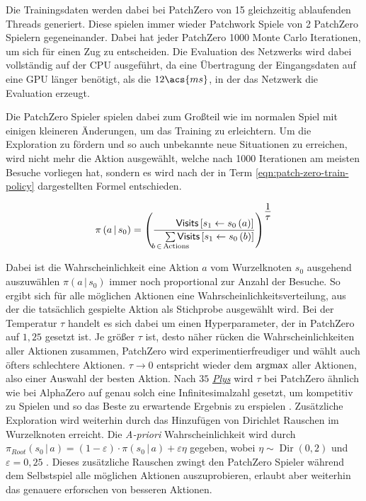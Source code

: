 Die Trainingsdaten werden dabei bei PatchZero von 15 gleichzeitig ablaufenden Threads generiert. Diese spielen immer wieder Patchwork Spiele von 2 PatchZero Spielern gegeneinander. Dabei hat jeder PatchZero 1000 Monte Carlo Iterationen, um sich für einen Zug zu entscheiden. Die Evaluation des Netzwerks wird dabei vollständig auf der \ac{CPU} ausgeführt, da eine Übertragung der Eingangsdaten auf eine \ac{GPU} länger benötigt, als die $12\acs{ms}$, in der das Netzwerk die Evaluation erzeugt.

Die PatchZero Spieler spielen dabei zum Großteil wie im normalen Spiel mit einigen kleineren Änderungen, um das Training zu erleichtern. Um die Exploration zu fördern und so auch unbekannte neue Situationen zu erreichen, wird nicht mehr die Aktion ausgewählt, welche nach 1000 Iterationen am meisten Besuche vorliegen hat, sondern es wird nach der in Term \ref{eqn:patch-zero-train-policy} dargestellten Formel entschieden.

\begin{align}
    \label{eqn:patch-zero-train-policy}
    \pi\left(a\,|\,s_0\right) = \left(\frac{\phantom{ab\sum} \mathsf{Visits}\left[s_1 \gets s_0\left(a\right) \right]}{\phantom{ab}\sum\limits_{\mathclap{b\, \in\, \text{Actions}}} \mathsf{Visits}\left[s_1 \gets s_0\left(b\right) \right]}\right)^{\text{\Large $\frac{1}{\tau}$}}
\end{align}

Dabei ist die Wahrscheinlichkeit eine Aktion $a$ vom Wurzelknoten $s_0$ ausgehend auszuwählen $\pi\left(a\,|\,s_0\right)$ immer noch proportional zur Anzahl der Besuche. So ergibt sich für alle möglichen Aktionen eine Wahrscheinlichkeitsverteilung, aus der die tatsächlich gespielte Aktion als Stichprobe ausgewählt wird. Bei der Temperatur $\tau$ handelt es sich dabei um einen Hyperparameter, der in PatchZero auf $1{,}25$ gesetzt ist. Je größer $\tau$ ist, desto näher rücken die Wahrscheinlichkeiten aller Aktionen zusammen, \dash PatchZero wird experimentierfreudiger und wählt auch öfters schlechtere Aktionen. $\tau \to 0$ entspricht wieder dem $\operatorname*{argmax}$ aller Aktionen, also einer Auswahl der besten Aktion. Nach $35$ \hyperref[text:ply]{\emph{Plys}} wird $\tau$ bei PatchZero ähnlich wie bei AlphaZero auf genau solch eine Infinitesimalzahl gesetzt, um kompetitiv zu Spielen und so das Beste zu erwartende Ergebnis zu erspielen \cite[Anhang, S. 2]{2017.AlphaGoZeroPaper}. Zusätzliche Exploration wird weiterhin durch das Hinzufügen von Dirichlet Rauschen im Wurzelknoten erreicht. Die \emph{A-priori} Wahrscheinlichkeit wird durch $\pi_{Root}\left(s_0\,|\,a\right) = (1 - \varepsilon) \cdot \pi\left(s_0\,|\,a\right) + \varepsilon\eta$ gegeben, wobei $\eta \sim \operatorname{Dir}(0{,}2)$ und $\varepsilon = 0{,}25$ \cite[Anhang, S. 2]{2017.AlphaGoZeroPaper}. Dieses zusätzliche Rauschen zwingt den PatchZero Spieler während dem Selbstspiel alle möglichen Aktionen auszuprobieren, erlaubt aber weiterhin das genauere erforschen von besseren Aktionen.


